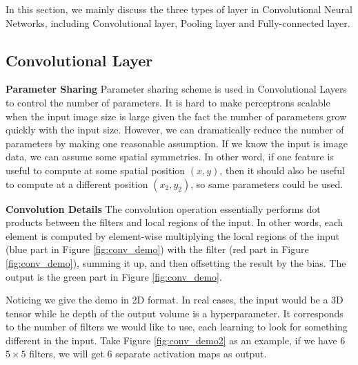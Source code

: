 \documentclass[twoside]{article}
\begin{document}
In this section, we mainly discuss the three types of layer in Convolutional Neural Networks, including Convolutional layer, Pooling layer and Fully-connected layer.

\subsection{Convolutional Layer}
\textbf{Parameter Sharing}
Parameter sharing scheme is used in Convolutional Layers to control the number of parameters. It is hard to make perceptrons scalable when the input image size is large given the fact the number of parameters grow quickly with the input size. However, we can dramatically reduce the number of parameters by making one reasonable assumption. If we know the input is image data, we can assume some spatial symmetries. In other word, if one feature is useful to compute at some spatial position $(x,y)$, then it should also be useful to compute at a different position $(x_2,y_2)$, so same parameters could be used.

\textbf{Convolution Details}
The convolution operation essentially performs dot products between the filters and local regions of the input. In other words, each element is computed by element-wise multiplying the local regions of the input (blue part in Figure \ref{fig:conv_demo}) with the filter (red part in Figure \ref{fig:conv_demo}), summing it up, and then offsetting the result by the bias. The output is the green part in Figure \ref{fig:conv_demo}.

Noticing we give the demo in 2D format. In real cases, the input would be a 3D tensor while he depth of the output volume is a hyperparameter. It corresponds to the number of filters we would like to use, each learning to look for something different in the input. Take Figure \ref{fig:conv_demo2} as an example, if we have 6 $5\times5$ filters, we will get 6 separate activation maps as output.
\end{document}
